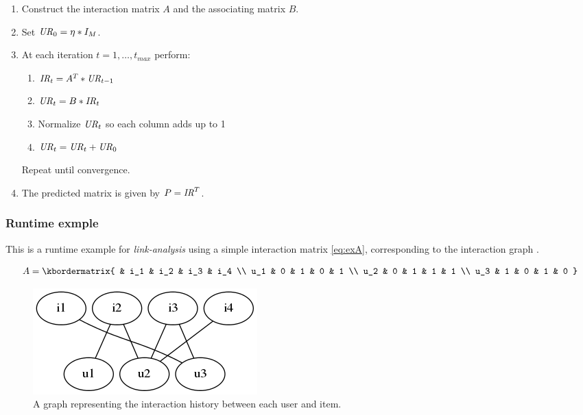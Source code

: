 \begin{enumerate}
    \item Construct the interaction matrix $A$ and the associating matrix $B$.

    \item Set $\mathit{UR}_0 = \eta * I_M$.
    \item At each iteration $t = 1, \ldots, t_{max}$ perform:

        \begin{enumerate}
            \item $\mathit{IR}_t = A^T * \mathit{UR}_{t- 1}$
            \item $\mathit{UR}_t = B * \mathit{IR}_t$
            \item Normalize $\mathit{UR}_t$ so each column adds up to 1
            \item $\mathit{UR}_t = \mathit{UR}_t + \mathit{UR}_0$
        \end{enumerate}

        Repeat until convergence.

    \item The predicted matrix is given by $P = \mathit{IR}^T$.

\end{enumerate}


\subsubsection{Runtime exmple}

This is a runtime example for \textit{link-analysis} using a simple interaction matrix \eqref{eq:exA}, corresponding to the interaction graph .

\begin{equation}\label{eq:exA}
  A = \kbordermatrix{
    &    i_1 & i_2 & i_3 & i_4 \\
    u_1 & 0   & 1   & 0   & 1  \\
    u_2 & 0   & 1   & 1   & 1  \\
    u_3 & 1   & 0   & 1   & 0
  }
\end{equation}

\begin{figure}[h!]
    \centering
    \includegraphics[width=0.3\linewidth]{fig/example_run/item_user_graph.png}
    \caption{A graph representing the interaction history between each user and item.}
    \label{fig:ex_graph}
\end{figure}


